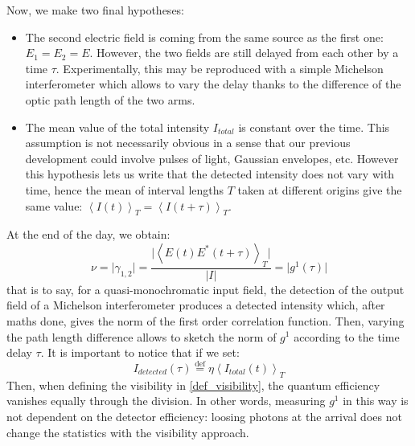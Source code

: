 \documentclass[11pt]{report}
\begin{document}
Now, we make two final hypotheses:
\begin{itemize}
	\item The second electric field is coming from the same source as the first one: $E_1 = E_2 = E$. However, the two fields are still delayed from each other by a time $\tau$. Experimentally, this may be reproduced with a simple Michelson interferometer which allows to vary the delay thanks to the difference of the optic path length of the two arms.
	\item The mean value of the total intensity $I_{total}$ is constant over the time. This assumption is not necessarily obvious in a sense that our previous development could involve pulses of light, Gaussian envelopes, etc. However this hypothesis lets us write that the detected intensity does not vary with time, hence the mean of interval lengths $T$ taken at  different origins give the same value: $\left\langle I(t) \right\rangle_T = \left\langle I(t + \tau) \right\rangle _T$.
\end{itemize}
At the end of the day, we obtain:
\begin{equation}
\nu = \vert \gamma_{1, 2} \vert = \frac{\vert\left\langle E(t) E^*(t + \tau) \right\rangle _T\vert}{\vert I \vert} = \vert g^1(\tau) \vert
\end{equation}
that is to say, for a quasi-monochromatic input field, the detection of the output field of a Michelson interferometer produces a detected intensity which, after maths done, gives the norm of the first order correlation function. Then, varying the path length difference allows to sketch the norm of $g^1$ according to the time delay $\tau$. It is important to notice that if we set:
\begin{equation}
\label{i_detect_eta}
I_{detected}(\tau) \stackrel{\text{def}}{=} \eta \left\langle I_{total}(t) \right\rangle_T
\end{equation}
Then, when defining the visibility in \eqref{def_visibility}, the quantum efficiency vanishes equally through the division. In other words, measuring $g^1$ in this way is not dependent on the detector efficiency: loosing photons at the arrival does not change the statistics with the visibility approach.
\end{document}
